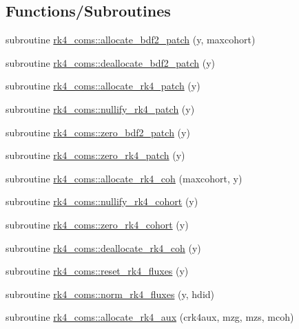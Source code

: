 \subsection*{Functions/\+Subroutines}
\begin{DoxyCompactItemize}
\item 
subroutine \hyperlink{namespacerk4__coms_a292fa2f7c65668f516015eff1a3b74e2}{rk4\+\_\+coms\+::allocate\+\_\+bdf2\+\_\+patch} (y, maxcohort)
\item 
subroutine \hyperlink{namespacerk4__coms_a38274254cb16401c20124f7620f64ab2}{rk4\+\_\+coms\+::deallocate\+\_\+bdf2\+\_\+patch} (y)
\item 
subroutine \hyperlink{namespacerk4__coms_a52256ca0348235c95a467581d6067dac}{rk4\+\_\+coms\+::allocate\+\_\+rk4\+\_\+patch} (y)
\item 
subroutine \hyperlink{namespacerk4__coms_a34a6a346af3d032c14f416435801598a}{rk4\+\_\+coms\+::nullify\+\_\+rk4\+\_\+patch} (y)
\item 
subroutine \hyperlink{namespacerk4__coms_a4dc0257365f3ec4614c2e41451517e28}{rk4\+\_\+coms\+::zero\+\_\+bdf2\+\_\+patch} (y)
\item 
subroutine \hyperlink{namespacerk4__coms_a4206f404f555c50ee6570211356bd537}{rk4\+\_\+coms\+::zero\+\_\+rk4\+\_\+patch} (y)
\item 
subroutine \hyperlink{namespacerk4__coms_ac355c3cf81ffef1c269338cf8b07c4bc}{rk4\+\_\+coms\+::allocate\+\_\+rk4\+\_\+coh} (maxcohort, y)
\item 
subroutine \hyperlink{namespacerk4__coms_afe54efd0ad9ab38983314ca0d2557e26}{rk4\+\_\+coms\+::nullify\+\_\+rk4\+\_\+cohort} (y)
\item 
subroutine \hyperlink{namespacerk4__coms_a1053434edb41147cb74257d6339eab8f}{rk4\+\_\+coms\+::zero\+\_\+rk4\+\_\+cohort} (y)
\item 
subroutine \hyperlink{namespacerk4__coms_a56a9eb1fd462e81374c5993b69d3d05c}{rk4\+\_\+coms\+::deallocate\+\_\+rk4\+\_\+coh} (y)
\item 
subroutine \hyperlink{namespacerk4__coms_a02aeb5f0e99479e6eef3029472a79781}{rk4\+\_\+coms\+::reset\+\_\+rk4\+\_\+fluxes} (y)
\item 
subroutine \hyperlink{namespacerk4__coms_ad9cf07917e6000f8f46e84428647b494}{rk4\+\_\+coms\+::norm\+\_\+rk4\+\_\+fluxes} (y, hdid)
\item 
subroutine \hyperlink{namespacerk4__coms_afe1de3958c4ca4c64d5fb2160fced95f}{rk4\+\_\+coms\+::allocate\+\_\+rk4\+\_\+aux} (crk4aux, mzg, mzs, mcoh)
\item 

\end{DoxyCompactItemize}
